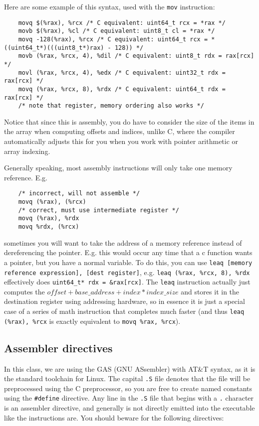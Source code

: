 \documentclass[11pt]{article}
\begin{document}
Here are some example of this syntax, used with the \texttt{mov} instruction:

\begin{lstlisting}
    movq $(%rax), %rcx /* C equivalent: uint64_t rcx = *rax */
    movb $(%rax), %cl /* C equivalent: uint8_t cl = *rax */
    movq -128(%rax), %rcx /* C equivalent: uint64_t rcx = *((uint64_t*)(((uint8_t*)rax) - 128)) */
    movb (%rax, %rcx, 4), %dil /* C equivalent: uint8_t rdx = rax[rcx] */
    movl (%rax, %rcx, 4), %edx /* C equivalent: uint32_t rdx = rax[rcx] */
    movq (%rax, %rcx, 8), %rdx /* C equivalent: uint64_t rdx = rax[rcx] */
    /* note that register, memory ordering also works */
\end{lstlisting}

Notice that since this is assembly, you do have to consider the size of the items in the
array when computing offsets and indices, unlike C, where the compiler automatically
adjusts this for you when you work with pointer arithmetic or array indexing.

Generally speaking, most assembly instructions will only take one memory reference. E.g.

\begin{lstlisting}
    /* incorrect, will not assemble */
    movq (%rax), (%rcx)
    /* correct, must use intermediate register */
    movq (%rax), %rdx
    movq %rdx, (%rcx)
\end{lstlisting}

sometimes you will want to take the address of a memory reference instead of dereferencing
the pointer. E.g. this would occur any time that a c function wants a pointer, but you
have a normal variable. To do this, you can use \texttt{leaq [memory reference
expression], [dest register]}, e.g. \texttt{leaq (\%rax, \%rcx, 8), \%rdx} effectively
does \texttt{uint64\_t* rdx = \&rax[rcx]}. The \texttt{leaq} instruction actually just
computes the $offset + base\_address + index * index\_size$ and stores it in the
destination register using addressing hardware, so in essence it is just a special case
of a series of math instruction that completes much faster (and thus \texttt{leaq (\%rax),
\%rcx} is exactly equivalent to \texttt{movq \%rax, \%rcx}).

\subsection{Assembler directives}

In this class, we are using the GAS (GNU ASsembler) with AT\&T syntax, as it is the
standard toolchain for Linux. The capital \texttt{.S} file denotes that the file will be
preprocessed using the C preprocessor, so you are free to create named constants using the
\texttt{\#define} directive. Any line in the \texttt{.S} file that begins with a \texttt{.}
character is an assembler directive, and generally is not directly emitted into the
executable like the instructions are. You should beware for the following directives:
\end{document}
